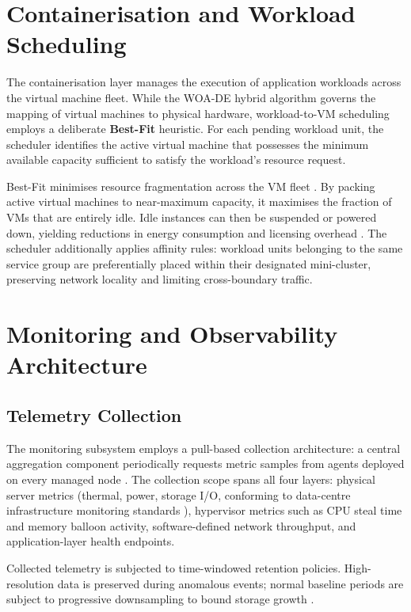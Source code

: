 \documentclass[12pt,a4paper]{report}
\begin{document}
\section{Containerisation and Workload Scheduling}

The containerisation layer manages the execution of application workloads across the
virtual machine fleet. While the WOA-DE hybrid algorithm governs the mapping of
virtual machines to physical hardware, workload-to-VM scheduling employs a deliberate
\textbf{Best-Fit} heuristic. For each pending workload unit, the scheduler identifies
the active virtual machine that possesses the minimum available capacity sufficient to
satisfy the workload's resource request.

Best-Fit minimises resource fragmentation across the VM fleet
\cite{begam2020timer}. By packing active virtual machines to near-maximum capacity,
it maximises the fraction of VMs that are entirely idle. Idle instances can then be
suspended or powered down, yielding reductions in energy consumption and licensing
overhead \cite{yang2025task}. The scheduler additionally applies affinity rules: workload
units belonging to the same service group are preferentially placed within their
designated mini-cluster, preserving network locality and limiting cross-boundary
traffic.

\section{Monitoring and Observability Architecture}

\subsection{Telemetry Collection}

The monitoring subsystem employs a pull-based collection architecture: a central
aggregation component periodically requests metric samples from agents deployed on
every managed node \cite{nguyen2022load}. The collection scope spans all four layers:
physical server metrics (thermal, power, storage I/O, conforming to data-centre
infrastructure monitoring standards \cite{balabanov2025dcim}), hypervisor metrics such as
CPU steal time and memory balloon activity, software-defined network throughput, and
application-layer health endpoints.

Collected telemetry is subjected to time-windowed retention policies. High-resolution
data is preserved during anomalous events; normal baseline periods are subject to
progressive downsampling to bound storage growth \cite{bompotas2025commc}.
\end{document}

